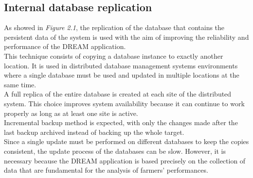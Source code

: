 \subsection{Internal database replication}
As showed in \textit{Figure 2.1}, the replication of the database that contains the persistent data of the system is used with the aim of improving the reliability and performance of the DREAM application.\\

This technique consists of copying a database instance to exactly another location. It is used in distributed database management systems environments where a single database must be used and updated in multiple locations at the same time.\\
A full replica of the entire database is created at each site of the distributed system. This choice improves system availability because it can continue to work properly as long as at least one site is active.\\

Incremental backup method is expected, with only the changes made after the last backup archived instead of backing up the whole target. \\

Since a single update must be performed on different databases to keep the copies consistent, the update process of the databases can be slow. However, it is necessary because the DREAM application is based precisely on the collection of data that are fundamental for the analysis of farmers' performances.